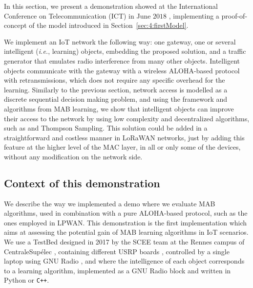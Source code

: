 

\graphicspath{{2-Chapters/4-Chapter/IEEE_WCNC_2019__DemoICT.git/pictures/}}

In this section, we present a demonstration showed at the International Conference on Telecommunication (ICT) in June $2018$ \cite{Besson2018ICT,Besson2019WCNC}, implementing a proof-of-concept of the model introduced in Section~\ref{sec:4:firstModel}.

We implement an IoT network the following way: one gateway, one or several intelligent (\emph{i.e.}, learning) objects, embedding the proposed solution,
and a traffic generator that emulates radio interference from many other objects.
Intelligent objects communicate with the gateway with a wireless ALOHA-based protocol with retransmissions, which does not require any specific overhead for the learning.
%
Similarly to the previous section, network access is modelled as a discrete sequential decision making problem, and using the framework and algorithms from MAB learning, we show that intelligent objects can improve their access to the network by using low complexity and decentralized algorithms, such as \UCB{} and Thompson Sampling.
%
This solution could be added in a straightforward and costless manner in LoRaWAN networks, just by adding this feature at the higher level of the MAC layer, in all or only some of the devices, without any modification on the network side.


\subsection{Context of this demonstration}
\label{sub:42:motivation}

We describe the way we implemented a demo where we evaluate MAB algorithms, used in combination with a pure ALOHA-based protocol, such as the ones employed in LPWAN.
This demonstration is the first implementation which aims at assessing the potential gain of MAB learning algorithms in IoT scenarios.
%
We use a TestBed designed in 2017 by the SCEE team at the Rennes campus of CentraleSupélec \cite[Appendix~3]{Bodinier17}, containing different USRP boards \cite{USRPDocumentation}, controlled by a single laptop using GNU Radio \cite{GNURadioDocumentation},
and where the intelligence of each object corresponds to a learning algorithm, implemented as a GNU Radio block \cite{GNURadioCompanionDocumentation} and written in Python or \texttt{C++}.


